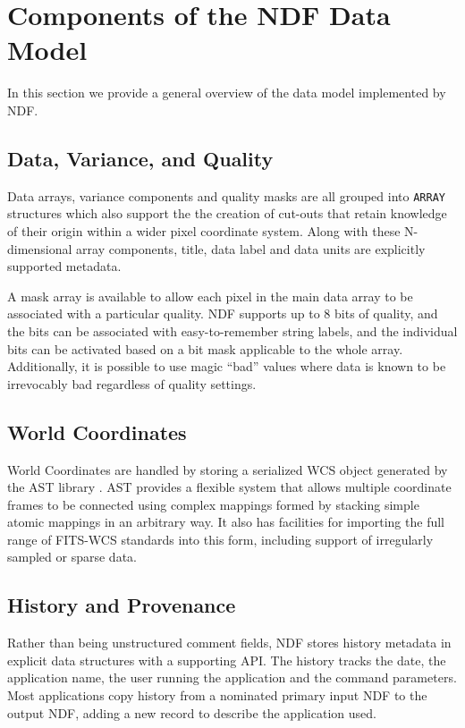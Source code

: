 \documentclass[11pt,twoside]{article}
\begin{document}
\section{Components of the NDF Data Model}

In this section we provide a general overview of the data model
implemented by NDF.

\subsection{Data, Variance, and Quality}

Data arrays, variance components and quality masks are all grouped
into \texttt{ARRAY} structures which also support the the creation of
cut-outs that retain knowledge of their origin within a wider pixel
coordinate system.  Along with these N-dimensional array components,
title, data label and data units are explicitly supported metadata.

A mask array is available to allow each pixel in the main data array
to be associated with a particular quality. NDF supports up to 8 bits
of quality, and the bits can be associated with easy-to-remember
string labels, and the individual bits can be activated based on a bit
mask applicable to the whole array. Additionally, it is possible to
use magic ``bad'' values where data is known to be irrevocably bad
regardless of quality settings.

\subsection{World Coordinates}

World Coordinates are handled by storing a serialized WCS object
generated by the AST library \citep{1998ASPC..145...41W}. AST provides
a flexible system that allows multiple coordinate frames to be
connected using complex mappings formed by stacking simple atomic
mappings in an arbitrary way. It also has facilities for importing the
full range of FITS-WCS standards \citep[see
e.g.][]{2006A&A...446..747G,2012ASPC..461..825B} into this form,
including support of irregularly sampled or sparse data.

\subsection{History and Provenance}

Rather than being unstructured comment fields, NDF stores history
metadata in explicit data structures with a supporting API. The
history tracks the date, the application name, the user running the
application and the command parameters. Most applications copy history
from a nominated primary input NDF to the output NDF, adding a new
record to describe the application used.
\end{document}
